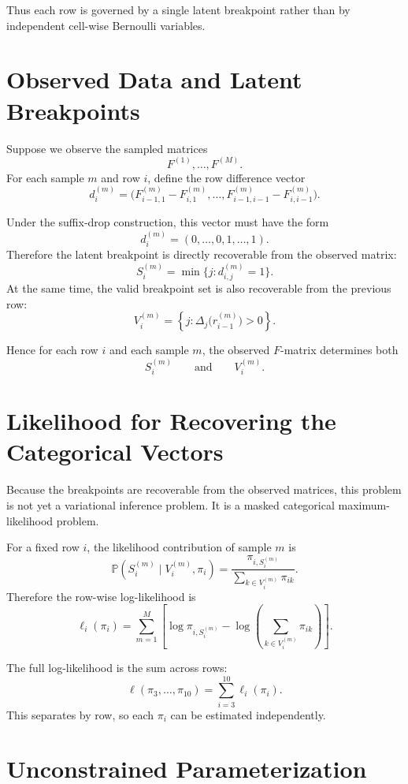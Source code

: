 \documentclass[11pt]{article}
\begin{document}
Thus each row is governed by a single latent breakpoint rather than by independent
cell-wise Bernoulli variables.

\section{Observed Data and Latent Breakpoints}

Suppose we observe the sampled matrices
\[
F^{(1)}, \ldots, F^{(M)}.
\]
For each sample $m$ and row $i$, define the row difference vector
\[
d_i^{(m)}
=
\bigl(
F_{i-1,1}^{(m)} - F_{i,1}^{(m)},
\ldots,
F_{i-1,i-1}^{(m)} - F_{i,i-1}^{(m)}
\bigr).
\]

Under the suffix-drop construction, this vector must have the form
\[
d_i^{(m)} = (0, \ldots, 0, 1, \ldots, 1).
\]
Therefore the latent breakpoint is directly recoverable from the observed matrix:
\[
S_i^{(m)} = \min\{j : d_{i,j}^{(m)} = 1\}.
\]
At the same time, the valid breakpoint set is also recoverable from the previous
row:
\[
V_i^{(m)}
=
\left\{
j : \Delta_j\bigl(r_{i-1}^{(m)}\bigr) > 0
\right\}.
\]

Hence for each row $i$ and each sample $m$, the observed $F$-matrix determines
both
\[
S_i^{(m)}
\qquad \text{and} \qquad
V_i^{(m)}.
\]

\section{Likelihood for Recovering the Categorical Vectors}

Because the breakpoints are recoverable from the observed matrices, this problem
is not yet a variational inference problem. It is a masked categorical
maximum-likelihood problem.

For a fixed row $i$, the likelihood contribution of sample $m$ is
\[
\mathbb{P}(S_i^{(m)} \mid V_i^{(m)}, \pi_i)
=
\frac{\pi_{i,S_i^{(m)}}}
{\sum_{k \in V_i^{(m)}} \pi_{ik}}.
\]
Therefore the row-wise log-likelihood is
\[
\ell_i(\pi_i)
=
\sum_{m=1}^M
\left[
\log \pi_{i,S_i^{(m)}}
-
\log\left(
\sum_{k \in V_i^{(m)}} \pi_{ik}
\right)
\right].
\]

The full log-likelihood is the sum across rows:
\[
\ell(\pi_3, \ldots, \pi_{10})

=
\sum_{i=3}^{10} \ell_i(\pi_i).
\]
This separates by row, so each $\pi_i$ can be estimated independently.

\section{Unconstrained Parameterization}
\end{document}

